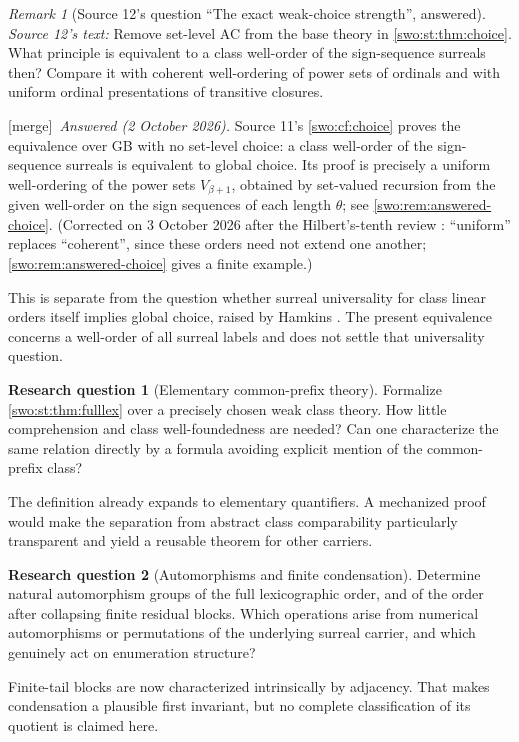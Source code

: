 \documentclass[11pt]{article}
\theoremstyle{definition}
\newtheorem{question}[question]{Research question}
\theoremstyle{remark}
\newtheorem{remark}[remark]{Remark}
\newcommand{\merge}{\textsf{[merge]}}
\begin{document}
\begin{remark}[Source 12's question ``The exact weak-choice strength'', answered]\label{swo:st:n14.5}
\emph{Source 12's text:} Remove set-level AC from the base theory in \cref{swo:st:thm:choice}. What
principle is equivalent to a class well-order of the sign-sequence
surreals then? Compare it with coherent well-ordering of power sets of
ordinals and with uniform ordinal presentations of transitive closures.

\merge\ \emph{Answered (2 October 2026).} Source 11's \cref{swo:cf:choice} proves the
equivalence over GB with no set-level choice: a class well-order of the
sign-sequence surreals is equivalent to global choice. Its proof is
precisely a uniform well-ordering of the power sets $V_{\beta+1}$,
obtained by set-valued recursion from the given well-order on the sign
sequences of each length $\theta$; see \cref{swo:rem:answered-choice}.
(Corrected on 3 October 2026 after the Hilbert's-tenth review
: ``uniform'' replaces
``coherent'', since these orders need not extend one another;
\cref{swo:rem:answered-choice} gives a finite example.)
\end{remark}
This is separate from the question whether surreal universality for
class linear orders itself implies global choice, raised by Hamkins
\cite{HamkinsUnivChoice}. The present equivalence concerns a well-order of
all surreal labels and does not settle that universality question.

\begin{question}[Elementary common-prefix theory]\label{swo:st:n14.6}
Formalize \cref{swo:st:thm:fulllex} over a precisely chosen weak class theory.
How little comprehension and class well-foundedness are needed? Can one
characterize the same relation directly by a formula avoiding explicit
mention of the common-prefix class?
\end{question}
The definition already expands to elementary quantifiers. A mechanized
proof would make the separation from abstract class comparability
particularly transparent and yield a reusable theorem for other carriers.

\begin{question}[Automorphisms and finite condensation]\label{swo:st:n14.7}
Determine natural automorphism groups of the full lexicographic order,
and of the order after collapsing finite residual blocks. Which
operations arise from numerical automorphisms or permutations of the
underlying surreal carrier, and which genuinely act on enumeration
structure?
\end{question}
Finite-tail blocks are now characterized intrinsically by adjacency.
That makes condensation a plausible first invariant, but no complete
classification of its quotient is claimed here.
\end{document}
